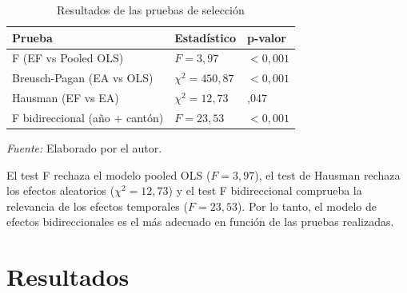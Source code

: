 \documentclass[12pt,a4paper]{article}
\newcommand{\Fuente}[1]{%
  \par{\fontsize{11}{13}\selectfont\textit{Fuente:} #1\par}
}
\begin{document}
\begin{table}[H]
\caption{Resultados de las pruebas de selección}
{\fontsize{11}{13}\selectfont
\begin{tabularx}{\textwidth}{>{\RaggedRight\arraybackslash}X >{\centering\arraybackslash}p{3.2cm} >{\centering\arraybackslash}p{2.3cm}}
\toprule
Prueba & Estadístico & p-valor \\
\midrule
F (EF vs Pooled OLS) & \(F = 3,97\) & \(<0,001\) \\
Breusch-Pagan (EA vs OLS) & \(\chi^2 = 450,87\) & \(<0,001\) \\
Hausman (EF vs EA) & \(\chi^2 = 12,73\) & 0,047 \\
F bidireccional (año + cantón) & \(F = 23,53\) & \(<0,001\) \\
\bottomrule
\end{tabularx}
}
\Fuente{Elaborado por el autor.}
\end{table}

El test F rechaza el modelo pooled OLS (\(F = 3,97\)), el test de Hausman rechaza los efectos aleatorios (\(\chi^2 = 12,73\)) y el test F bidireccional comprueba la relevancia de los efectos temporales (\(F = 23,53\)). Por lo tanto, el modelo de efectos bidireccionales es el más adecuado en función de las pruebas realizadas.

\section*{Resultados}
\end{document}
